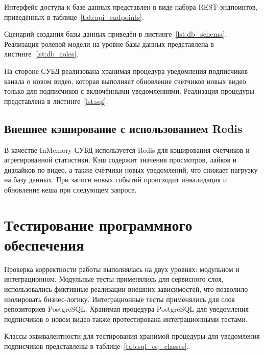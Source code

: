 Интерфейс доступа к базе данных представлен в виде набора REST-эндпоинтов, приведённых в таблице~\ref{tab:api_endpoints}.

Сценарий создания базы данных приведён в листинге~\ref{lst:db_schema}.
Реализация ролевой модели на уровне базы данных представлена в листинге~\ref{lst:db_roles}.

На стороне СУБД реализована хранимая процедура уведомления подписчиков канала о новом видео, которая выполняет обновление счётчиков новых видео только для подписчиков с включёнными уведомлениями.
Реализация процедуры представлена в листинге~\ref{lst:sql}.

\subsection*{Внешнее кэширование с использованием Redis}

В качестве InMemory СУБД используется Redis для кэширования счётчиков и агрегированной статистики.
Кэш содержит значения просмотров, лайков и дизлайков по видео, а также счётчики новых уведомлений, что снижает нагрузку на базу данных.
При записи новых событий происходит инвалидация и обновление кеша при следующем запросе.


\section{Тестирование программного обеспечения}

Проверка корректности работы выполнялась на двух уровнях: модульном и интеграционном.
Модульные тесты применялись для сервисного слоя, использовались фиктивные реализации внешних зависимостей, что позволило изолировать бизнес-логику.
Интеграционные тесты применялись для слоя репозиториев PostgreSQL\@.
Хранимая процедура PostgreSQL для уведомления подписчиков о новом видео также протестирована интеграционными тестами.

Классы эквивалентности для тестирования хранимой процедуры для уведомления подписчиков представлены в таблице~\ref{tab:sql_eq_classes}.

